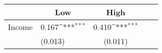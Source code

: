 {
\def\sym#1{\ifmmode^{#1}\else\(^{#1}\)\fi}
\begin{tabular*}{.4\hsize}{@{\hskip\tabcolsep\extracolsep\fill}l*{2}{lc}}
\toprule
                &\multicolumn{1}{c}{Low}&\multicolumn{1}{c}{High}\\
\midrule
Income          &    0.167\sym{***}&    0.410\sym{***}\\
                &  (0.013)         &  (0.011)         \\
\bottomrule
\end{tabular*}
}
